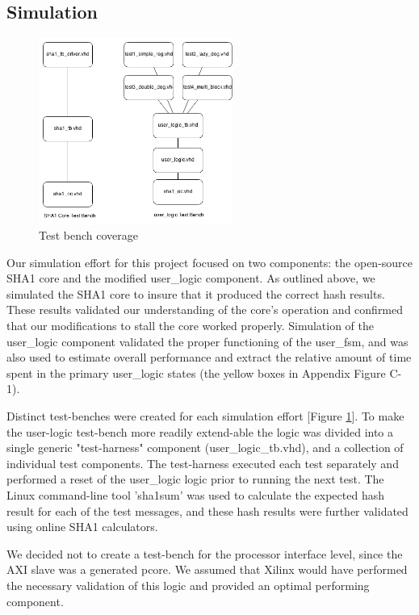 \documentclass[journal]{IEEEtran}
\begin{document}
\subsection{Simulation}
\begin{figure}[ht]
\centering
\includegraphics[width=2.5in]{Test_Benches.png}
\caption{Test bench coverage}
\label{fig_TB}
\end{figure} 
Our simulation effort for this project focused on two components: the open-source SHA1 core and the modified user\_logic component.  As outlined above, we simulated the SHA1 core to insure that it produced the correct hash results.  These results validated our understanding of the core's operation and confirmed that our modifications to stall the core worked properly.  Simulation of the user\_logic component validated the proper functioning of the user\_fsm, and was also used to estimate overall performance and extract the relative amount of time spent in the primary user\_logic states (the yellow boxes in Appendix Figure C-1).

Distinct test-benches were created for each simulation effort [Figure \ref{fig_TB}].  To make the user-logic test-bench more readily extend-able the logic was divided into a single generic "test-harness" component (user\_logic\_tb.vhd), and a collection of individual test components.  The test-harness executed each test separately and performed a reset of the user\_logic logic prior to running the next test.  The Linux command-line tool 'sha1sum'\cite{SHASUM}  was used to calculate the expected hash result for each of the test messages, and these hash results were further validated using online SHA1 calculators\cite{SHASUMONLINE}.

We decided not to create a test-bench for the processor interface level, since the AXI slave was a generated pcore.  We assumed that Xilinx would have performed the necessary validation of this logic and provided an optimal performing component.
\end{document}
